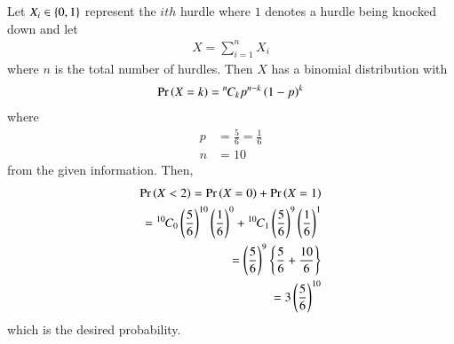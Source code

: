 Let $X_i \in \left\{0,1\right\}$ represent the $ith$ hurdle where $1$ denotes a hurdle being knocked down and let
\begin{align}
X = \sum_{i=1}^{n}X_i
\end{align}
%
where $n$ is the total number of hurdles.
Then $X$ has a binomial distribution with
%
\begin{align}
\Pr\left(X = k\right) = {{}^{n}\mkern-1muC_{k}}p^{n-k}\left(1-p\right)^k
\end{align}
%
where 
\begin{align}
p &= \frac{5}{6} = \frac{1}{6}
\\
n &= 10
\end{align}
from the given information.  Then,
\begin {align}
\Pr\left(X < 2\right) = \Pr\left(X = 0\right) + \Pr\left(X=1\right)
\\
= {{}^{10}\mkern-1muC_{0}}\left(\frac{5}{6}\right)^{10}\left(\frac{1}{6}\right)^0+ 
 {{}^{10}\mkern-1muC_{1}}\left(\frac{5}{6}\right)^{9}\left(\frac{1}{6}\right)^1 
\\
=\left(\frac{5}{6}\right)^{9}\left\{\frac{5}{6}+\frac{10}{6}\right\}
\\
=3\left(\frac{5}{6}\right)^{10}
\end{align}
%
which is the desired probability.
